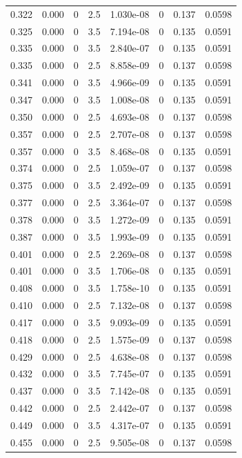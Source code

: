 \documentclass[preview]{standalone}
\begin{document}
{{{\begin{tabular}{L{1.2cm}C{1.2cm} C{0.3cm}C{0.5cm} C{1.4cm}C{1.4cm} C{1.4cm}C{1.4cm}}
  0.322  &  0.000  & 0     & 2.5 &  1.030e-08  & 0  & 0.137 &  0.0598   \\ 
  0.325  &  0.000  & 0     & 3.5 &  7.194e-08  & 0  & 0.135 &  0.0591   \\ 
  0.335  &  0.000  & 0     & 3.5 &  2.840e-07  & 0  & 0.135 &  0.0591   \\ 
  0.335  &  0.000  & 0     & 2.5 &  8.858e-09  & 0  & 0.137 &  0.0598   \\ 
  0.341  &  0.000  & 0     & 3.5 &  4.966e-09  & 0  & 0.135 &  0.0591   \\ 
  0.347  &  0.000  & 0     & 3.5 &  1.008e-08  & 0  & 0.135 &  0.0591   \\ 
  0.350  &  0.000  & 0     & 2.5 &  4.693e-08  & 0  & 0.137 &  0.0598   \\ 
  0.357  &  0.000  & 0     & 2.5 &  2.707e-08  & 0  & 0.137 &  0.0598   \\ 
  0.357  &  0.000  & 0     & 3.5 &  8.468e-08  & 0  & 0.135 &  0.0591   \\ 
  0.374  &  0.000  & 0     & 2.5 &  1.059e-07  & 0  & 0.137 &  0.0598   \\ 
  0.375  &  0.000  & 0     & 3.5 &  2.492e-09  & 0  & 0.135 &  0.0591   \\ 
  0.377  &  0.000  & 0     & 2.5 &  3.364e-07  & 0  & 0.137 &  0.0598   \\ 
  0.378  &  0.000  & 0     & 3.5 &  1.272e-09  & 0  & 0.135 &  0.0591   \\ 
  0.387  &  0.000  & 0     & 3.5 &  1.993e-09  & 0  & 0.135 &  0.0591   \\ 
  0.401  &  0.000  & 0     & 2.5 &  2.269e-08  & 0  & 0.137 &  0.0598   \\ 
  0.401  &  0.000  & 0     & 3.5 &  1.706e-08  & 0  & 0.135 &  0.0591   \\ 
  0.408  &  0.000  & 0     & 3.5 &  1.758e-10  & 0  & 0.135 &  0.0591   \\ 
  0.410  &  0.000  & 0     & 2.5 &  7.132e-08  & 0  & 0.137 &  0.0598   \\ 
  0.417  &  0.000  & 0     & 3.5 &  9.093e-09  & 0  & 0.135 &  0.0591   \\ 
  0.418  &  0.000  & 0     & 2.5 &  1.575e-09  & 0  & 0.137 &  0.0598   \\ 
  0.429  &  0.000  & 0     & 2.5 &  4.638e-08  & 0  & 0.137 &  0.0598   \\ 
  0.432  &  0.000  & 0     & 3.5 &  7.745e-07  & 0  & 0.135 &  0.0591   \\ 
  0.437  &  0.000  & 0     & 3.5 &  7.142e-08  & 0  & 0.135 &  0.0591   \\ 
  0.442  &  0.000  & 0     & 2.5 &  2.442e-07  & 0  & 0.137 &  0.0598   \\ 
  0.449  &  0.000  & 0     & 3.5 &  4.317e-07  & 0  & 0.135 &  0.0591   \\ 
  0.455  &  0.000  & 0     & 2.5 &  9.505e-08  & 0  & 0.137 &  0.0598   \\ 
\hline 
\end{tabular} 

}}}
\end{document}
